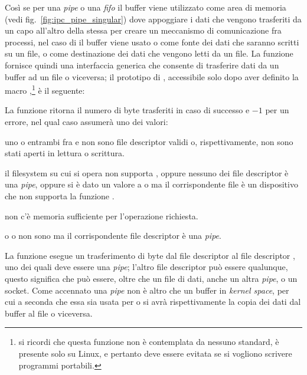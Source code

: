 Così se per una \textit{pipe} o una \textit{fifo} il buffer viene utilizzato
come area di memoria (vedi fig.~\ref{fig:ipc_pipe_singular}) dove appoggiare i
dati che vengono trasferiti da un capo all'altro della stessa per creare un
meccanismo di comunicazione fra processi, nel caso di  il buffer
viene usato o come fonte dei dati che saranno scritti su un file, o come
destinazione dei dati che vengono letti da un file. La funzione fornisce
quindi una interfaccia generica che consente di trasferire dati da un buffer
ad un file o viceversa; il prototipo di , accessibile solo dopo
aver definito la macro ,\footnote{si ricordi che questa
  funzione non è contemplata da nessuno standard, è presente solo su Linux, e
  pertanto deve essere evitata se si vogliono scrivere programmi portabili.}
è il seguente:

\begin{funcproto}{
}

{La funzione ritorna il numero di byte trasferiti in caso di successo e $-1$
  per un errore, nel qual caso  assumerà uno dei valori:
  \begin{errlist}
    \item[\errcode{EBADF}] uno o entrambi fra  e 
      non sono file descriptor validi o, rispettivamente, non sono stati
      aperti in lettura o scrittura.
    \item[\errcode{EINVAL}] il filesystem su cui si opera non supporta
      , oppure nessuno dei file descriptor è una \textit{pipe},
      oppure si 
      è dato un valore a  o  ma il
      corrispondente file è un dispositivo che non supporta la funzione
      .
    \item[\errcode{ENOMEM}] non c'è memoria sufficiente per l'operazione
      richiesta.
    \item[\errcode{ESPIPE}] o  o  non sono
       ma il corrispondente file descriptor è una \textit{pipe}.
  \end{errlist}
}
\end{funcproto}


La funzione esegue un trasferimento di  byte dal file descriptor
 al file descriptor , uno dei quali deve essere
una \textit{pipe}; l'altro file descriptor può essere qualunque, questo
significa che può essere, oltre che un file di dati, anche un altra
\textit{pipe}, o un socket.  Come accennato una \textit{pipe} non è altro che
un buffer in \textit{kernel space}, per cui a seconda che essa sia usata
per  o  si avrà rispettivamente la copia dei dati
dal buffer al file o viceversa.

